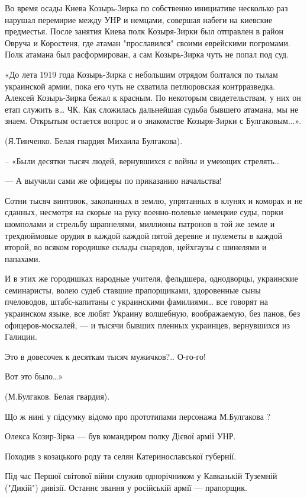 Во время осады Киева Козырь-Зирка по собственно инициативе несколько раз
нарушал перемирие между УНР и немцами, совершая набеги на киевские
предместья. После занятия Киева полк Козыря-Зирки был отправлен в район
Овруча и Коростеня, где атаман "прославился" своими еврейскими погромами.
Полк атамана был расформирован, а сам Козырь-Зирка чуть не попал под суд. 

«До лета 1919 года Козырь-Зирка с небольшим отрядом болтался по тылам
украинской армии, пока его чуть не схватила петлюровская контрразведка.
Алексей Козырь-Зирка бежал к красным. По некоторым свидетельствам, у них
он етап служить в… ЧК. Как сложилась дальнейшая судьба бывшего атамана, мы
не знаем. Открытым остается вопрос и о знакомстве Козыря-Зирки с
Булгаковым...».

(Я.Тинченко. Белая гвардия Михаила Булгакова).

– «Были десятки тысяч людей, вернувшихся с войны и умеющих стрелять…

— А выучили сами же офицеры по приказанию начальства!

Сотни тысяч винтовок, закопанных в землю, упрятанных в клунях и коморах и не
сданных, несмотря на скорые на руку военно-полевые немецкие суды, порки
шомполами и стрельбу шрапнелями, миллионы патронов в той же земле и
трехдюймовые орудия в каждой каждой пятой деревне и пулеметы в каждой второй,
во всяком городишке склады снарядов, цейхгаузы с шинелями и папахами.

И в этих же городишках народные учителя, фельдшера, однодворцы, украинские
семинаристы, волею судеб ставшие прапорщиками, здоровенные сыны пчеловодов,
штабс-капитаны с украинскими фамилиями… все говорят на украинском языке, все
любят Украину волшебную, воображаемую, без панов, без офицеров-москалей, — и
тысячи бывших пленных украинцев, вернувшихся из Галиции.

Это в довесочек к десяткам тысяч мужичков?.. О-го-го!

Вот это было…»

(М.Булгаков. Белая гвардия).

Що ж нині у підсумку відомо про прототипами персонажа М.Булгакова ?

Олекса Козир-Зірка — був командиром полку Дієвої армії УНР.

Походив з козацького роду та селян Катеринославської губернії. 

Під час Першої світової війни служив однорічником у Кавказькій Туземній
("Дикій") дивізії. Останнє звання у російській армії — прапорщик.

